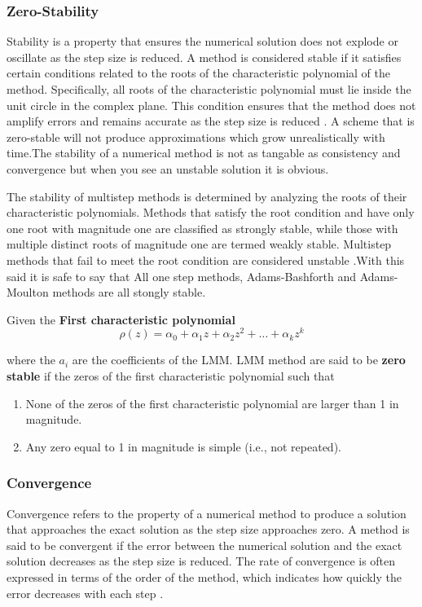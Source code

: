 \documentclass[a4paper, twoside]{report} %
\begin{document}
	\subsubsection*{Zero-Stability}
	Stability is a property that ensures the numerical solution does not explode or oscillate as the step size is reduced. A method is considered stable if it satisfies certain conditions related to the roots of the characteristic polynomial of the method. Specifically, all roots of the characteristic polynomial must lie inside the unit circle in the complex plane. This condition ensures that the method does not amplify errors and remains accurate as the step size is reduced \cite{wiki:analysis} \cite{Alexanderian2022}. A scheme that is zero-stable will not produce approximations which grow unrealistically with time.The stability of a numerical method is not as tangable as consistency and convergence but when you see an unstable solution it is obvious.

	The stability of multistep methods is determined by analyzing the roots of their characteristic polynomials. Methods that satisfy the root condition and have only one root with magnitude one are classified as strongly stable, while those with multiple distinct roots of magnitude one are termed weakly stable. Multistep methods that fail to meet the root condition are considered unstable \cite{butler_numerical_2022}.With this said it is safe to say that All one step methods, Adams-Bashforth and Adams-Moulton methods are all stongly stable.

	Given the \textbf{First characteristic polynomial}
	\begin{equation}
		\rho(z) = \alpha_0 + \alpha_1 z + \alpha_2 z^2 + \dots + \alpha_k z^k
	\end{equation}

	where the $a_i$ are the coefficients of the LMM.
	LMM method are said to be \textbf{zero stable} if the zeros of the first characteristic polynomial such that

	\begin{enumerate}
		\item None of the zeros of the first characteristic polynomial are larger than 1 in magnitude.
		\item Any zero equal to 1 in magnitude is simple (i.e., not repeated).
	\end{enumerate}

	\subsubsection*{Convergence}
	Convergence refers to the property of a numerical method to produce a solution that approaches the exact solution as the step size approaches zero. A method is said to be convergent if the error between the numerical solution and the exact solution decreases as the step size is reduced. The rate of convergence is often expressed in terms of the order of the method, which indicates how quickly the error decreases with each step \cite{2022JFatokunEtAl}.
\end{document}
